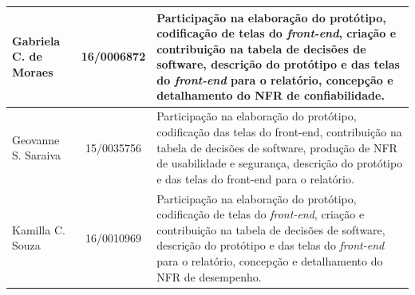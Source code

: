 \begin{apendicesenv}
\begin{table}[H]
\begin{adjustbox}{max width = \textwidth}
\begin{tabular}{|G{4cm}|c|L{10cm}|}
        Gabriela C. de Moraes &  16/0006872 &  Participação na elaboração do protótipo, codificação de telas do \textit{front-end}, criação e contribuição na tabela de decisões de software, descrição do protótipo e das telas do \textit{front-end} para o relatório, concepção e detalhamento do NFR de confiabilidade.  \\ \hline
        Geovanne S. Saraiva &  15/0035756 & Participação na elaboração do protótipo, codificação das telas do front-end, contribuição na tabela de decisões de software, produção de NFR de usabilidade e segurança, descrição do protótipo e das telas do front-end 
        para o relatório. \\ \hline
        Kamilla C. Souza &  16/0010969 & Participação na elaboração do protótipo, codificação de telas do \textit{front-end}, criação e contribuição na tabela de decisões de software, descrição do protótipo e das telas do \textit{front-end} para o relatório, concepção e detalhamento do NFR de desempenho. \\ \hline

        \end{tabular}
    \end{adjustbox}
\end{table}

\end{apendicesenv}

